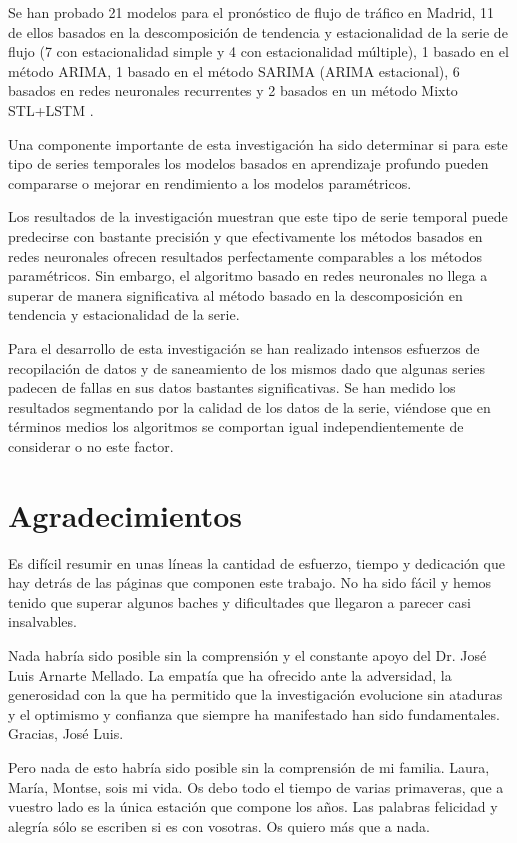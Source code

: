 \documentclass[]{book}
\begin{document}
Se han probado 21 modelos para el pronóstico de flujo de tráfico en Madrid, 11 de ellos basados en la descomposición de tendencia y estacionalidad de la serie de flujo (7 con estacionalidad simple y 4 con estacionalidad múltiple), 1 basado en el método ARIMA, 1 basado en el método SARIMA (ARIMA estacional), 6 basados en redes neuronales recurrentes y 2 basados en un método Mixto STL+LSTM .

Una componente importante de esta investigación ha sido determinar si para este tipo de series temporales los modelos basados en aprendizaje profundo pueden compararse o mejorar en rendimiento a los modelos paramétricos.

Los resultados de la investigación muestran que este tipo de serie temporal puede predecirse con bastante precisión y que efectivamente los métodos basados en redes neuronales ofrecen resultados perfectamente comparables a los métodos paramétricos. Sin embargo, el algoritmo basado en redes neuronales no llega a superar de manera significativa al método basado en la descomposición en tendencia y estacionalidad de la serie.

Para el desarrollo de esta investigación se han realizado intensos esfuerzos de recopilación de datos y de saneamiento de los mismos dado que algunas series padecen de fallas en sus datos bastantes significativas. Se han medido los resultados segmentando por la calidad de los datos de la serie, viéndose que en términos medios los algoritmos se comportan igual independientemente de considerar o no este factor.


\chapter*{Agradecimientos}


Es difícil resumir en unas líneas la cantidad de esfuerzo, tiempo y dedicación que hay detrás de las páginas que componen este trabajo. No ha sido fácil y hemos tenido que superar algunos baches y dificultades que llegaron a parecer casi insalvables.

Nada habría sido posible sin la comprensión y el constante apoyo del Dr. José Luis Arnarte Mellado. La empatía que ha ofrecido ante la adversidad, la generosidad con la que ha permitido que la investigación evolucione sin ataduras y el optimismo y confianza que siempre ha manifestado han sido fundamentales. Gracias, José Luis.

Pero nada de esto habría sido posible sin la comprensión de mi familia. Laura, María, Montse, sois mi vida. Os debo todo el tiempo de varias primaveras, que a vuestro lado es la única estación que compone los años. Las palabras felicidad y alegría sólo se escriben si es con vosotras. Os quiero más que a nada.
\end{document}
